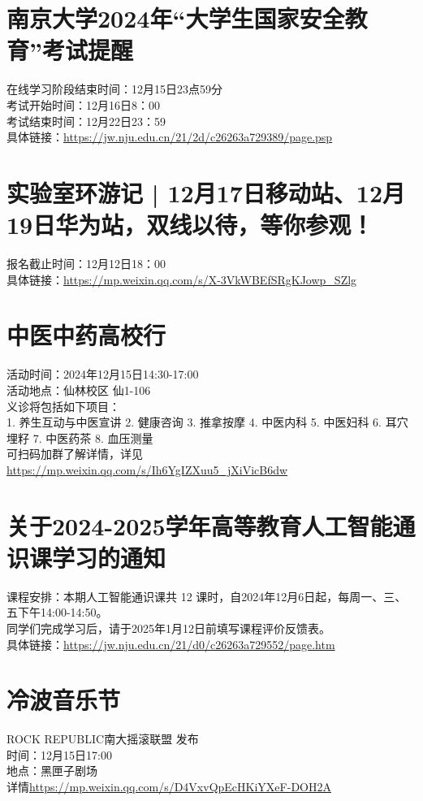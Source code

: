 \documentclass[letterpaper, 12pt]{article}
\begin{document}
\begin{multicols}{2}
\section{南京大学2024年“大学生国家安全教育”考试提醒}
在线学习阶段结束时间：12月15日23点59分\\
考试开始时间：12月16日8：00\\
考试结束时间：12月22日23：59\\
具体链接：\url{https://jw.nju.edu.cn/21/2d/c26263a729389/page.psp}\\
\section{实验室环游记 | 12月17日移动站、12月19日华为站，双线以待，等你参观！}
报名截止时间：12月12日18：00\\
具体链接：\url{https://mp.weixin.qq.com/s/X-3VkWBEfSRgKJowp_SZlg}

\section{中医中药高校行}
活动时间：2024年12月15日14:30-17:00\\
活动地点：仙林校区 仙1-106\\
义诊将包括如下项目：\\
1. 养生互动与中医宣讲 2. 健康咨询 3. 推拿按摩 4. 中医内科 5. 中医妇科 6. 耳穴埋籽 7. 中医药茶 8. 血压测量\\
可扫码加群了解详情，详见\url{https://mp.weixin.qq.com/s/Ih6YgIZXuu5_jXiVicB6dw}

\section{关于2024-2025学年高等教育人工智能通识课学习的通知}
课程安排：本期人工智能通识课共 12 课时，自2024年12月6日起，每周一、三、五下午14:00-14:50。\\
同学们完成学习后，请于2025年1月12日前填写课程评价反馈表。\\
具体链接：\url{https://jw.nju.edu.cn/21/d0/c26263a729552/page.htm}\\

\section{冷波音乐节}
ROCK REPUBLIC南大摇滚联盟 发布\\
时间：12月15日17:00\\
地点：黑匣子剧场\\
详情\url{https://mp.weixin.qq.com/s/D4VxvQpEcHKiYXeF-DOH2A}\\


\end{multicols}
\end{document}
